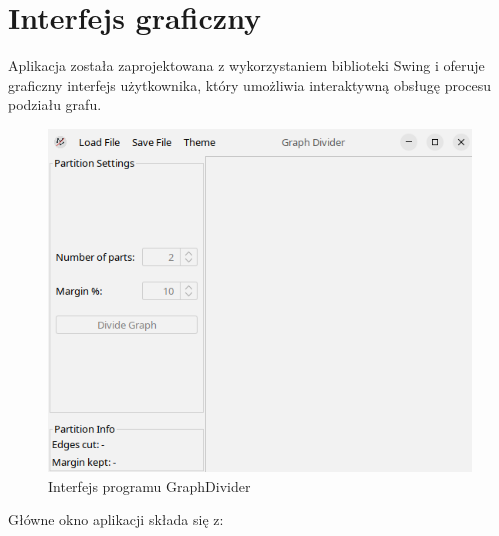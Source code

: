 \documentclass{article}
\begin{document}
\section{Interfejs graficzny}

    Aplikacja została zaprojektowana z wykorzystaniem biblioteki Swing i oferuje graficzny interfejs użytkownika, który umożliwia interaktywną obsługę procesu podziału grafu.

    \begin{figure}[H]
        \centering
        \includegraphics[width=1\linewidth]{img/gui.png}
        \caption{Interfejs programu GraphDivider}
        \label{fig:gui}
    \end{figure}


    Główne okno aplikacji składa się z:
    
\end{document}
